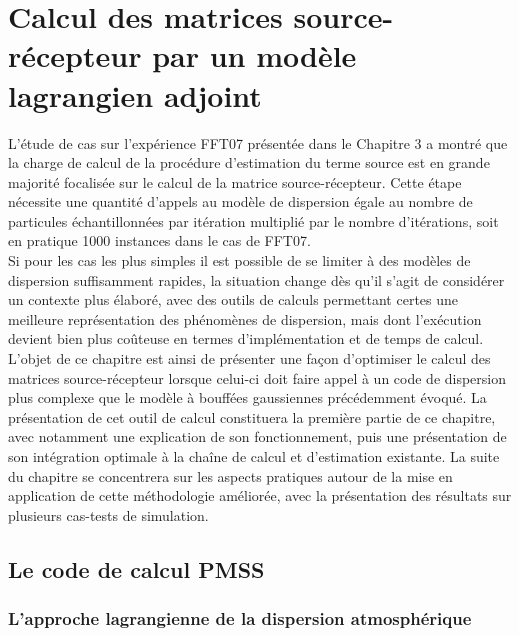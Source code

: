 \chapter{Calcul des matrices source-récepteur par un modèle lagrangien adjoint}

L'étude de cas sur l'expérience FFT07 présentée dans le Chapitre 3 a montré que la charge de calcul de la procédure d'estimation du terme source est en grande majorité focalisée sur le calcul de la matrice source-récepteur. Cette étape nécessite une quantité d'appels au modèle de dispersion égale au nombre de particules échantillonnées par itération multiplié par le nombre d'itérations, soit en pratique 1000 instances dans le cas de FFT07. \\

Si pour les cas les plus simples il est possible de se limiter à des modèles de dispersion suffisamment rapides, la situation change dès qu'il s'agit de considérer un contexte plus élaboré, avec des outils de calculs permettant certes une meilleure représentation des phénomènes de dispersion, mais dont l'exécution devient bien plus coûteuse en termes d'implémentation et de temps de calcul. \\

L'objet de ce chapitre est ainsi de présenter une façon d'optimiser le calcul des matrices source-récepteur lorsque celui-ci doit faire appel à un code de dispersion plus complexe que le modèle à bouffées gaussiennes précédemment évoqué. La présentation de cet outil de calcul constituera la première partie de ce chapitre, avec notamment une explication de son fonctionnement, puis une présentation de son intégration optimale à la chaîne de calcul et d'estimation existante. La suite du chapitre se concentrera sur les aspects pratiques autour de la mise en application de cette méthodologie améliorée, avec la présentation des résultats sur plusieurs cas-tests de simulation.


\section{Le code de calcul PMSS}

\subsection{L'approche lagrangienne de la dispersion atmosphérique}
\label{part_lagrangian}

